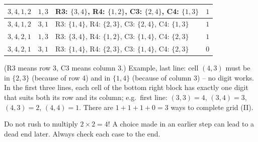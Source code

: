 {\begin{center}
\begin{tabular}{|c|c|l|c|}
$3, 4, 1, 2$ & $1, 3$ & R3: $\{3,4\}$, R4: $\{1,2\}$, C3: $\{2,4\}$, C4: $\{1,3\}$ & $1$\\ \hline
$3, 4, 1, 2$ & $3, 1$ & R3: $\{1,4\}$, R4: $\{2,3\}$, C3: $\{2,4\}$, C4: $\{1,3\}$ & $1$\\ \hline
$3, 4, 2, 1$ & $1, 3$ & R3: $\{3,4\}$, R4: $\{1,2\}$, C3: $\{1,4\}$, C4: $\{2,3\}$ & $1$\\ \hline
$3, 4, 2, 1$ & $3, 1$ & R3: $\{1,4\}$, R4: $\{2,3\}$, C3: $\{1,4\}$, C4: $\{2,3\}$ & $0$\\ \hline
\end{tabular}
\end{center}
(R3 means row 3, C3 means column 3.) Example, last line: cell $(4,3)$ must be in $\{2,3\}$ (because of row 4) and in $\{1,4\}$ (because
of column 3) -- no digit works. In the first three lines, each cell of the bottom right block has exactly one digit that suits both its
row and its column; e.g.\ first line: $(3,3) = 4$, $(3,4) = 3$, $(4,3) = 2$, $(4,4) = 1$.
There are $1 + 1 + 1 + 0 = 3$ ways to complete grid (II).
\begin{figC}
\begin{scope}[xshift=0cm]\end{scope}
\begin{scope}[xshift=4.1cm]\end{scope}
\begin{scope}[xshift=8.2cm]\end{scope}
\end{figC}
\begin{warnbox}Do not rush to multiply $2\times 2 = 4$! A choice made in an earlier step can lead to a dead end later. Always check each
case to the end.\end{warnbox}
}

